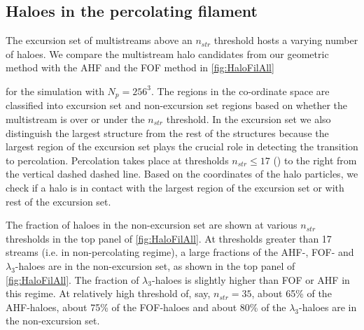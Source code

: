 \documentclass[fleqn,usenatbib,useAMS]{mnras}
\begin{document}
\subsection{Haloes in the percolating filament} 

The excursion set of multistreams above an $n_{str}$ threshold hosts a varying number of haloes. We compare the multistream halo candidates from our geometric method with the AHF and the FOF method in \autoref{fig:HaloFilAll} 

for the simulation with $N_p = 256^3$. The regions in the co-ordinate space are classified into excursion set and non-excursion set regions based on whether the multistream is over or under the $n_{str}$ threshold. In the excursion set we also distinguish the largest structure from  the rest of the structures because the largest region of the excursion set plays the crucial role  in detecting the  transition to percolation. Percolation takes place at thresholds $n_{str} \le 17$ (\citealt{Ramachandra2017}) to the right from  the vertical dashed dashed line. Based on the coordinates of the halo particles, we check if a halo is in contact with the largest region of the excursion set or with rest of the excursion set. 


The fraction of haloes in the non-excursion set are shown at various $n_{str}$ thresholds in the top panel of \autoref{fig:HaloFilAll}. At thresholds greater than 17 streams (i.e. in non-percolating regime), a large fractions of the AHF-, FOF- and $\lambda_3$-haloes are in the non-excursion set, as shown in the top panel of \autoref{fig:HaloFilAll}. The fraction of $\lambda_3$-haloes is slightly higher than FOF or AHF in this regime. At relatively high threshold of, say, $n_{str} = 35$, about 65\% of the AHF-haloes, about 75\% of the FOF-haloes and about 80\% of the $\lambda_3$-haloes are in the non-excursion set.  
\end{document}
